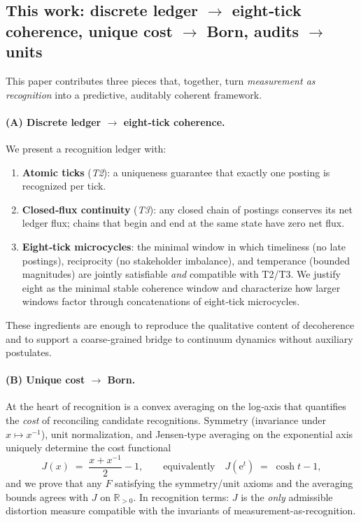 \documentclass[12pt,a4paper]{article}
\theoremstyle{definition}
\theoremstyle{remark}
\begin{document}
\subsection{This work: discrete ledger $\to$ eight‑tick coherence, unique cost $\to$ Born, audits $\to$ units}
\label{sec:this-work}

This paper contributes three pieces that, together, turn \emph{measurement as recognition} into a predictive, auditably coherent framework.

\paragraph{(A) Discrete ledger $\to$ eight‑tick coherence.}
We present a recognition ledger with:
\begin{enumerate}
  \item \textbf{Atomic ticks} (\emph{T2}): a uniqueness guarantee that exactly one posting is recognized per tick.
  \item \textbf{Closed‑flux continuity} (\emph{T3}): any closed chain of postings conserves its net ledger flux; chains that begin and end at the same state have zero net flux.
  \item \textbf{Eight‑tick microcycles}: the minimal window in which timeliness (no late postings), reciprocity (no stakeholder imbalance), and temperance (bounded magnitudes) are jointly satisfiable \emph{and} compatible with T2/T3. We justify eight as the minimal stable coherence window and characterize how larger windows factor through concatenations of eight‑tick microcycles.
\end{enumerate}
These ingredients are enough to reproduce the qualitative content of decoherence and to support a coarse‑grained bridge to continuum dynamics without auxiliary postulates.

\paragraph{(B) Unique cost $\to$ Born.}
At the heart of recognition is a convex averaging on the log‑axis that quantifies the \emph{cost} of reconciling candidate recognitions. Symmetry (invariance under $x \mapsto x^{-1}$), unit normalization, and Jensen‑type averaging on the exponential axis uniquely determine the cost functional
\[
  J(x) \;=\; \frac{x + x^{-1}}{2} - 1,
  \qquad
  \text{equivalently}\quad J(\mathrm{e}^t) \;=\; \cosh t - 1,
\]
and we prove that any $F$ satisfying the symmetry/unit axioms and the averaging bounds agrees with $J$ on $\mathbb{R}_{>0}$. In recognition terms: $J$ is the \emph{only} admissible distortion measure compatible with the invariants of measurement-as-recognition.
\end{document}

